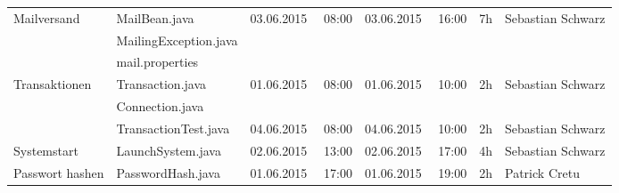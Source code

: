 \begin{landscape}
\begin{tabular}{|p{5.2cm} |p{7cm}|p{3.2cm}|p{3.2cm}|p{2cm}|p{3.5cm}|}
	\hline  Mailversand          & MailBean.java                              & 03.06.2015 \ \ 08:00       & 03.06.2015  \ \  16:00      &  7h                & Sebastian Schwarz\\ 	
	& MailingException.java                      &                            &                            &                                                  &\\
	& mail.properties                            &                            &                            &                                                  &\\
	\hline Transaktionen         & Transaction.java                           & 01.06.2015 \ \ 08:00       & 01.06.2015 \ \ 10:00        & 2h                 & Sebastian Schwarz\\  
	& Connection.java                            &                            &                            &                                                  &\\  
	& TransactionTest.java                       &  04.06.2015 \ \ 08:00      & 04.06.2015 \ \ 10:00       &   2h                       & Sebastian Schwarz \\                  
	\hline Systemstart           & LaunchSystem.java                          & 02.06.2015 \ \ 13:00       & 02.06.2015 \ \ 17:00        & 4h                 & Sebastian Schwarz\\
	\hline Passwort hashen       & PasswordHash.java                          & 01.06.2015 \ \ 17:00       & 01.06.2015 \ \ 19:00        & 2h                 & Patrick Cretu\\       	   
	\hline 
\end{tabular} \ \\
\ \\


\end{landscape}
